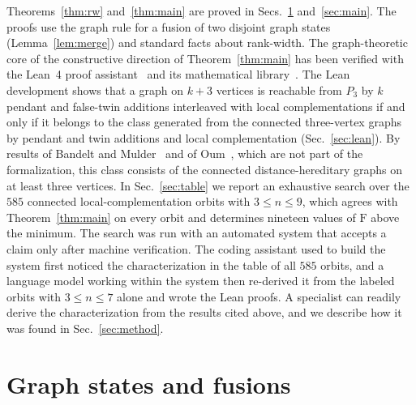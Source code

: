 \documentclass[aps,pra,onecolumn,superscriptaddress,nofootinbib,longbibliography]{revtex4-2}
\theoremstyle{plain}
\theoremstyle{remark}
\newcommand{\F}{\mathrm{F}}
\begin{document}
Theorems~\ref{thm:rw} and~\ref{thm:main} are proved in Secs.~\ref{sec:model} and~\ref{sec:main}. The proofs
use the graph rule for a fusion of two disjoint graph states (Lemma~\ref{lem:merge}) and standard facts
about rank-width. The graph-theoretic core of the constructive direction of Theorem~\ref{thm:main} has
been verified with the Lean~4 proof assistant~\cite{deMoura2021lean} and its mathematical
library~\cite{Mathlib2020lean}. The Lean development shows that a graph on $k+3$ vertices is reachable
from $P_3$ by $k$ pendant and false-twin additions interleaved with local complementations if and only if
it belongs to the class generated from the connected three-vertex graphs by pendant and twin additions and
local complementation (Sec.~\ref{sec:lean}). By results of Bandelt and Mulder~\cite{Bandelt1986distance}
and of Oum~\cite{Oum2005rank}, which are not part of the formalization, this class consists of the
connected distance-hereditary graphs on at least three vertices. In Sec.~\ref{sec:table} we report an exhaustive search over the $585$
connected local-complementation orbits with $3\le n\le 9$, which agrees with Theorem~\ref{thm:main} on
every orbit and determines nineteen values of $\F$ above the minimum. The search was run with an
automated system that accepts a claim only after machine verification. The coding assistant used to build
the system first noticed the characterization in the table of all $585$ orbits, and a language model
working within the system then re-derived it from the labeled orbits with $3\le n\le 7$ alone and wrote
the Lean proofs. A specialist can readily derive the characterization from the results cited above, and
we describe how it was found in Sec.~\ref{sec:method}.

\section{Graph states and fusions}\label{sec:model}
\end{document}

